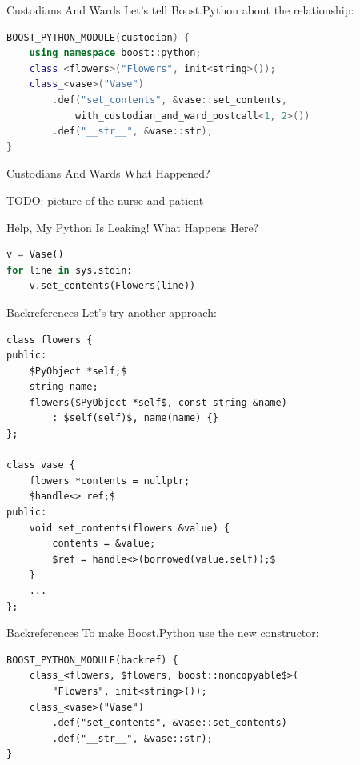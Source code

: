 \documentclass{beamer}
\begin{document}
\begin{frame}[fragile=singleslide]{Custodians And Wards}
  Let's tell Boost.Python about the relationship:
  \begin{lstlisting}[language=c++]
BOOST_PYTHON_MODULE(custodian) {
    using namespace boost::python;
    class_<flowers>("Flowers", init<string>());
    class_<vase>("Vase")
        .def("set_contents", &vase::set_contents,
            with_custodian_and_ward_postcall<1, 2>())
        .def("__str__", &vase::str);
}
  \end{lstlisting}
\end{frame}

\begin{frame}{Custodians And Wards}
  What Happened?

  TODO: picture of the nurse and patient
\end{frame}

\begin{frame}[fragile=singleslide]{Help, My Python Is Leaking!}
  What Happens Here?
  \begin{lstlisting}[language=python]
v = Vase()
for line in sys.stdin:
    v.set_contents(Flowers(line))
  \end{lstlisting}
\end{frame}

\begin{frame}[fragile=singleslide]{Backreferences}
  Let's try another approach:
  \begin{lstlisting}[language={[extra]c++}]
class flowers {
public:
    $PyObject *self;$
    string name;
    flowers($PyObject *self$, const string &name)
        : $self(self)$, name(name) {}
};

class vase {
    flowers *contents = nullptr;
    $handle<> ref;$
public:
    void set_contents(flowers &value) {
        contents = &value;
        $ref = handle<>(borrowed(value.self));$
    }
    ...
};
  \end{lstlisting}
\end{frame}

\begin{frame}[fragile=singleslide]{Backreferences}
  To make Boost.Python use the new constructor:
  \begin{lstlisting}[language={[extra]C++}]
BOOST_PYTHON_MODULE(backref) {
    class_<flowers, $flowers, boost::noncopyable$>(
        "Flowers", init<string>());
    class_<vase>("Vase")
        .def("set_contents", &vase::set_contents)
        .def("__str__", &vase::str);
}
  \end{lstlisting}
\end{frame}
\end{document}
